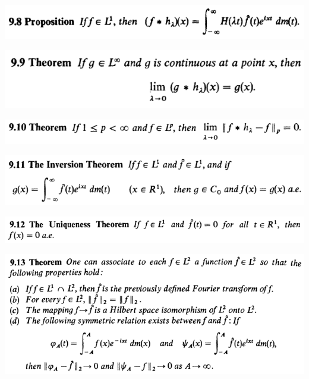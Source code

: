 \documentclass[12pt]{article}
\begin{document}
		\begin{center}
		\includegraphics{9ponto8}
		\end{center}

		\begin{center}
		\includegraphics{9ponto9}
		\end{center}

		\begin{center}
		\includegraphics{9ponto10}
		\end{center}

		\begin{center}
		\includegraphics{9ponto11}
		\end{center}

		\begin{center}
		\includegraphics{9ponto12}
		\end{center}

		\begin{center}
		\includegraphics{9ponto13}
		\end{center}
\end{document}
